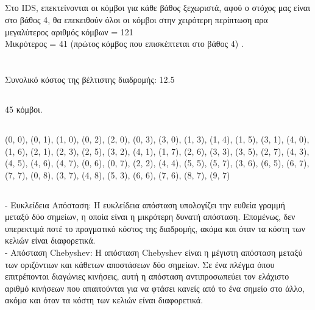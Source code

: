 \documentclass[12pt]{article}
\newcommand{\la}{\latintext}
\begin{document}
\subsection{\bold{\la IDS}}
Στο {\la IDS}, επεκτείνονται οι κόμβοι για κάθε βάθος ξεχωριστά, αφού ο στόχος μας είναι στο βάθος 4, θα επεκειθούν όλοι οι κόμβοι στην χειρότερη περίπτωση αρα μεγαλύτερος αριθμός κόμβων = 121\\
Μικρότερος = 41 (πρώτος κόμβος που επισκέπτεται στο βάθος 4) .
\section{} 
\subsection{}
Συνολικό κόστος της βέλτιστης διαδρομής: 12.5
\subsection{}
45 κόμβοι.
\subsection{}
(0, 0), (0, 1), (1, 0), (0, 2), (2, 0), (0, 3), (3, 0), (1, 3), (1, 4), (1, 5), (3, 1), (4, 0), (1, 6), (2, 1), (2, 3), (2, 5), (3, 2), (4, 1), (1, 7), (2, 6), (3, 3), (3, 5), (2, 7), (4, 3), (4, 5), (4, 6), (4, 7), (0, 6), (0, 7), (2, 2), (4, 4), (5, 5), (5, 7), (3, 6), (6, 5), (6, 7), (7, 7), (0, 8), (3, 7), (4, 8), (5, 3), (6, 6), (7, 6), (8, 7), (9, 7)
\subsection{}
- Ευκλείδεια Απόσταση: Η ευκλείδεια απόσταση υπολογίζει την ευθεία γραμμή μεταξύ δύο σημείων, η οποία είναι η μικρότερη δυνατή απόσταση. Επομένως, δεν υπερεκτιμά ποτέ το πραγματικό κόστος της διαδρομής, ακόμα και όταν τα κόστη των κελιών είναι διαφορετικά. \\
- Απόσταση {\la Chebyshev}: Η απόσταση Chebyshev είναι η μέγιστη απόσταση μεταξύ των οριζόντιων και κάθετων αποστάσεων δύο σημείων. Σε ένα πλέγμα όπου επιτρέπονται διαγώνιες κινήσεις, αυτή η απόσταση αντιπροσωπεύει τον ελάχιστο αριθμό κινήσεων που απαιτούνται για να φτάσει κανείς από το ένα σημείο στο άλλο, ακόμα και όταν τα κόστη των κελιών είναι διαφορετικά.
\section{} 
\end{document}
